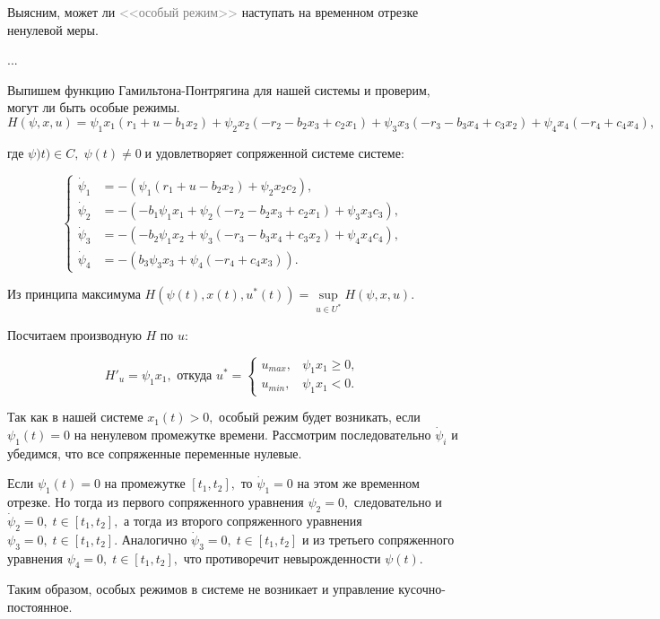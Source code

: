 \documentclass[11pt]{article}
\begin{document}
Выясним, может ли \textcolor{gray}{<<особый режим>>} наступать на временном отрезке ненулевой меры.

...

Выпишем функцию Гамильтона-Понтрягина для нашей системы и проверим, могут ли быть особые режимы.
$$H(\psi, x, u) = \psi_1x_1(r_1 + u - b_1x_2) + \psi_2x_2(-r_2 - b_2x_3 + c_2x_1) + \psi_3x_3(-r_3 - b_3x_4 + c_3x_2) + \psi_4x_4(-r_4 + c_4x_4),$$

где  $\psi)t) \in C, \; \psi(t) \ne 0 \; \text{и удовлетворяет сопряженной системе системе:}$

$$
\left\{
\begin{aligned}
	\dot \psi_1 &= -(\psi_1(r_1 + u - b_2x_2) + \psi_2x_2c_2), \\
	\dot \psi_2 &= -(-b_1\psi_1x_1 + \psi_2(-r_2 - b_2x_3 + c_2x_1) + \psi_3x_3c_3), \\
	\dot \psi_3 &= -(-b_2\psi_1x_2 + \psi_3(-r_3 - b_3x_4 + c_3x_2) + \psi_4x_4c_4), \\
	\dot \psi_4 &= -(b_3\psi_3x_3 + \psi_4(-r_4 + c_4x_3)).
\end{aligned}
\right.$$

Из принципа максимума $H(\psi(t), x(t), u^*(t)) = \sup\limits_{u \in U^*} H(\psi,x,u).$

Посчитаем производную $H$ по $u:$

$$H'_u = \psi_1x_1, \text{ откуда } u^* = \begin{cases} u_{max}, & \psi_1x_1 \geqslant 0, \\  u_{min}, & \psi_1x_1 < 0.\end{cases}$$

Так как в нашей системе $x_1(t) > 0,$ особый режим будет возникать, если $\psi_1(t) = 0$ на ненулевом промежутке времени. Рассмотрим последовательно $\dot \psi_i$ и убедимся, что все сопряженные переменные нулевые.

Если $\psi_1(t) = 0$ на промежутке $[t_1, t_2],$ то $\dot \psi_1 = 0$ на этом же временном отрезке. Но тогда из первого сопряженного уравнения $\psi_2 = 0,$ следовательно и $\dot \psi_2 = 0, \;  t \in [t_1, t_2],$ а тогда из второго сопряженного уравнения $\psi_3 = 0, \;  t \in [t_1, t_2].$ Аналогично $\dot \psi_3 = 0, \;  t \in [t_1, t_2]$ и из третьего сопряженного уравнения $\psi_4 = 0, \;  t \in [t_1, t_2],$ что противоречит невырожденности $\psi(t).$

Таким образом, особых режимов в системе не возникает и управление кусочно-постоянное.

%
%
\end{document}
